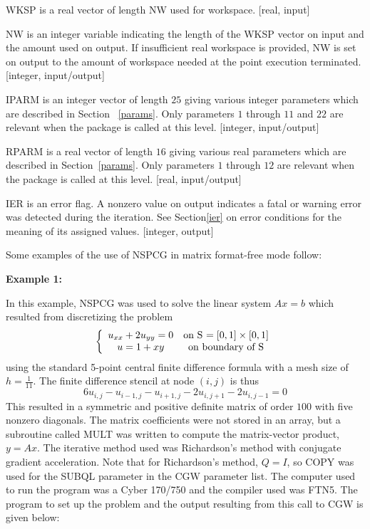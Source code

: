 \begin{list}{}{
               \leftmargin 1.00in \rightmargin 0.25in}
 \item[WKSP \hfill]
           is a real vector of length NW used for workspace.
           [real, input]
 
 \item[NW \hfill]
           is an integer variable indicating the length of the
           WKSP vector on input and the amount used on output.
           If insufficient real workspace is provided, NW is
           set on output to the amount of workspace needed 
           at the point execution terminated.  
           [integer, input/output]
 
 \item[IPARM \hfill]
           is an integer vector of length $25$ giving various
           integer parameters which are described in Section
           ~\ref{params}.  Only parameters $1$ through $11$ and 
           $22$ are relevant when the package is called at this 
           level.  [integer, input/output]
 
 \item[RPARM \hfill]
           is a real vector of length $16$ giving various real
           parameters which are described in Section~\ref{params}.
           Only parameters $1$ through $12$ are relevant when
           the package is called at this level.  [real, input/output]
 
 \item[IER \hfill]
           is an error flag.  A nonzero value on output indicates
           a fatal or warning error was detected during the
           iteration.  See Section\ref{ier} on error conditions
           for the meaning of its assigned values.  [integer, output]
\end{list}
\newpage
\indent
    
    Some examples of the use of NSPCG in matrix format-free mode
follow:
\bigskip

\noindent
{\bf Example 1:}
\bigskip
\indent

In this example, NSPCG was used to solve the linear system $Ax=b$
which resulted from discretizing the problem
\[ \left\{ \begin{array}{cc}
 u_{xx} + 2u_{yy} = 0 & \mbox{on S $= [0,1]\times[0,1]$} \\
 u = 1 + xy           & \mbox{on boundary of S}
\end{array} \right. \]
using the standard 5-point central finite difference formula with 
a mesh size of $h = \frac{1}{11}$.  The finite difference stencil 
at node $(i,j)$ is thus
\[ 6u_{i,j}-u_{i-1,j}-u_{i+1,j}-2u_{i,j+1}-2u_{i,j-1} = 0 \]
This resulted in a symmetric and positive definite matrix of order 
$100$ with five nonzero diagonals.  The matrix coefficients were
not stored in an array, but a subroutine called MULT was written
to compute the matrix-vector product, $y=Ax$. The iterative method 
used was Richardson's method with conjugate gradient acceleration.  
Note that for Richardson's method, $Q=I$, so COPY was used for
the SUBQL parameter in the CGW parameter list.
The computer used to run the program was a Cyber 170/750
and the compiler used was FTN5.  The program to set up the problem 
and the output resulting from this call to CGW is given below:

